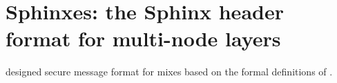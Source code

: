 \section{Sphinxes: the Sphinx header format for multi-node layers}%
\label{Sphinxes}

\Textcite{Sphinx} designed  secure message format for mixes based on 
the formal definitions of \textcite{CLOnionRouting}.
